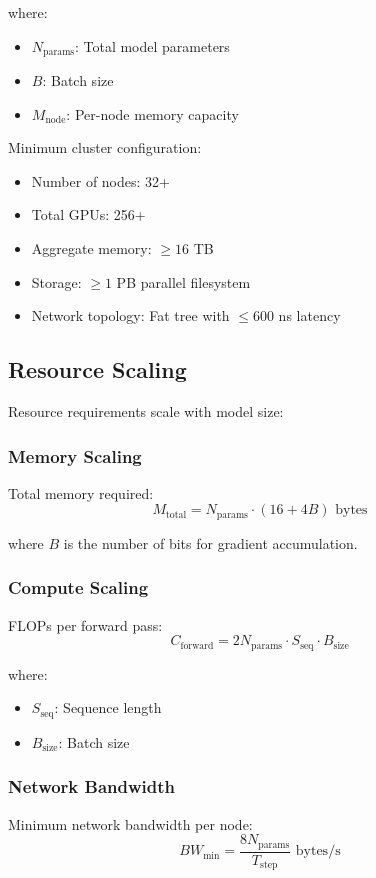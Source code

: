 \documentclass{article}
\begin{document}
where:
\begin{itemize}
\item $N_{\text{params}}$: Total model parameters
\item $B$: Batch size
\item $M_{\text{node}}$: Per-node memory capacity
\end{itemize}

Minimum cluster configuration:
\begin{itemize}
\item Number of nodes: 32+
\item Total GPUs: 256+
\item Aggregate memory: $\geq 16$ TB
\item Storage: $\geq 1$ PB parallel filesystem
\item Network topology: Fat tree with $\leq 600$ ns latency
\end{itemize}

\subsection{Resource Scaling}
Resource requirements scale with model size:

\subsubsection{Memory Scaling}
Total memory required:
\begin{equation}
M_{\text{total}} = N_{\text{params}} \cdot (16 + 4B) \text{ bytes}
\end{equation}

where $B$ is the number of bits for gradient accumulation.

\subsubsection{Compute Scaling}
FLOPs per forward pass:
\begin{equation}
C_{\text{forward}} = 2N_{\text{params}} \cdot S_{\text{seq}} \cdot B_{\text{size}}
\end{equation}

where:
\begin{itemize}
\item $S_{\text{seq}}$: Sequence length
\item $B_{\text{size}}$: Batch size
\end{itemize}

\subsubsection{Network Bandwidth}
Minimum network bandwidth per node:
\begin{equation}
BW_{\text{min}} = \frac{8N_{\text{params}}}{T_{\text{step}}} \text{ bytes/s}
\end{equation}
\end{document}
